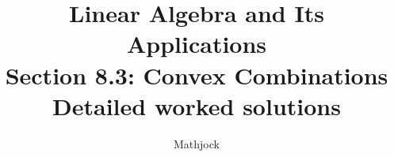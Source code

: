 
\title{\textbf{Linear Algebra and Its Applications}\\[0.3em]Section 8.3: Convex Combinations\\[0.3em]\large Detailed worked solutions}
\author{Mathjock}
\date{}

\maketitle
\bookinfo
\tableofcontents
\clearpage
\renewcommand{\thesection}{8.\arabic{section}}
\renewcommand{\theHsection}{8.\arabic{section}}
\setcounter{section}{2}



